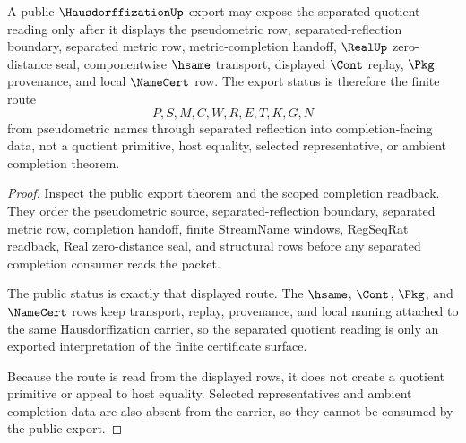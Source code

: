 \begin{theorem}
\label{thm:hausdorffization-public-export-status}
A public $\HausdorffizationUp$ export may expose the separated quotient reading only after it displays the pseudometric row, separated-reflection boundary, separated metric row, metric-completion handoff, $\RealUp$ zero-distance seal, componentwise $\hsame$ transport, displayed $\Cont$ replay, $\Pkg$ provenance, and local $\NameCert$ row. The export status is therefore the finite route
$$
P,S,M,C,W,R,E,T,K,G,N
$$
from pseudometric names through separated reflection into completion-facing data, not a quotient primitive, host equality, selected representative, or ambient completion theorem.
\end{theorem}
\begin{proof}
Inspect the public export theorem and the scoped completion readback. They order the pseudometric source, separated-reflection boundary, separated metric row, completion handoff, finite StreamName windows, RegSeqRat readback, Real zero-distance seal, and structural rows before any separated completion consumer reads the packet.

The public status is exactly that displayed route. The $\hsame$, $\Cont$, $\Pkg$, and $\NameCert$ rows keep transport, replay, provenance, and local naming attached to the same Hausdorffization carrier, so the separated quotient reading is only an exported interpretation of the finite certificate surface.

Because the route is read from the displayed rows, it does not create a quotient primitive or appeal to host equality. Selected representatives and ambient completion data are also absent from the carrier, so they cannot be consumed by the public export.
\end{proof}




